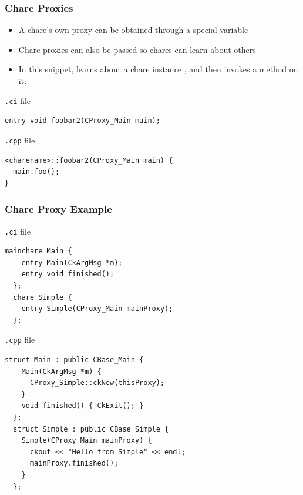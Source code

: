\begin{frame}[fragile]
  \frametitle{Chare Proxies}
  \begin{itemize}
  \item A chare's own proxy can be obtained through a special variable
  \item Chare proxies can also be passed so chares can learn about others
  \item In this snippet,  learns about a chare instance
    , and then invokes a method on it:
  \end{itemize}
\texttt{.ci} file
\begin{lstlisting}
entry void foobar2(CProxy_Main main);
\end{lstlisting}
\texttt{.cpp} file
\begin{lstlisting}
<charename>::foobar2(CProxy_Main main) {
  main.foo();
}
\end{lstlisting}
\end{frame}

\begin{frame}[fragile]
  \frametitle{Chare Proxy Example}
\texttt{.ci} file
\begin{lstlisting}[basicstyle=\tiny]
  mainchare Main {
    entry Main(CkArgMsg *m);
    entry void finished();
  };
  chare Simple {
    entry Simple(CProxy_Main mainProxy);
  };
\end{lstlisting}
\texttt{.cpp} file
\begin{lstlisting}[basicstyle=\tiny]
  struct Main : public CBase_Main {
    Main(CkArgMsg *m) {
      CProxy_Simple::ckNew(thisProxy);      
    }
    void finished() { CkExit(); }
  };
  struct Simple : public CBase_Simple {
    Simple(CProxy_Main mainProxy) {
      ckout << "Hello from Simple" << endl;
      mainProxy.finished();
    }
  };
\end{lstlisting}
\end{frame}

